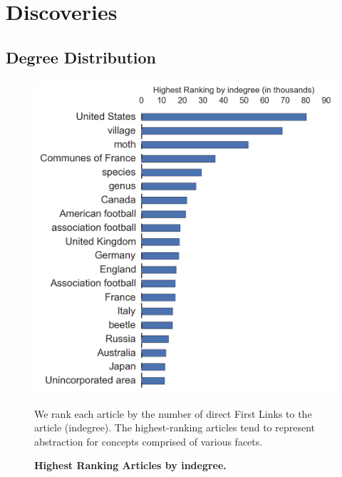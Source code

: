 \documentclass[pre,twocolumn,twoside,superscriptaddress,floatfix, aps, 10pt]{revtex4-1}
\begin{document}
\section{Discoveries}

\subsection{Degree Distribution}

\begin{figure}[tp!]
  \centering	
  \includegraphics[width=\columnwidth]{graphics/articles_ndegree.png}
  \caption{
    \textbf{Highest Ranking Articles by indegree.}
  }
  We rank each article by the number of direct First Links to the article (indegree). The highest-ranking articles tend to represent abstraction for concepts
  comprised of various facets.
  \label{fig:ndegree list}
\end{figure}
\end{document}
